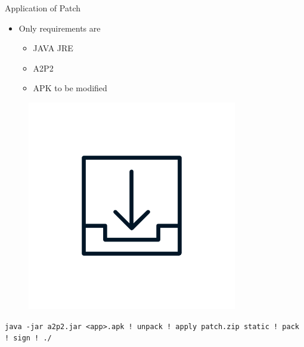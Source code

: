 \documentclass[aspectratio=169]{beamer}
\begin{document}

\begin{frame}{Application of Patch}
  \begin{minipage}{0.49\textwidth} 
    \begin{itemize}
      \item Only requirements are
      \begin{itemize}
        \item JAVA JRE
        \item A2P2
        \item APK to be modified
      \end{itemize}
    \end{itemize}
  \end{minipage}
  \hfill
  \begin{minipage}{0.49\textwidth} 
    \begin{figure}
      \centering
      \includegraphics[height=0.5\textheight]{figures/download.png}
    \end{figure}
  \end{minipage}

  \begin{center}
    \texttt{java -jar a2p2.jar <app>.apk ! unpack ! apply patch.zip static ! pack ! sign ! ./}
  \end{center}

\end{frame}
\end{document}
